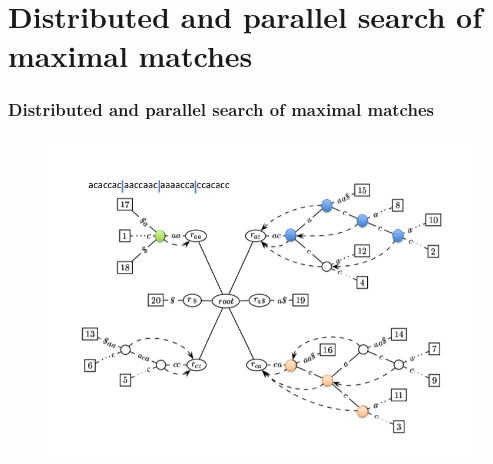 \documentclass{beamer}
\begin{document}
\section{Distributed and parallel search of maximal matches}
\begin{frame}
  \frametitle{Distributed and parallel search of maximal matches}
  \begin{figure}
    \includegraphics[scale=0.4]{dst_search.png}
   \end{figure}
\end{frame}
\end{document}
